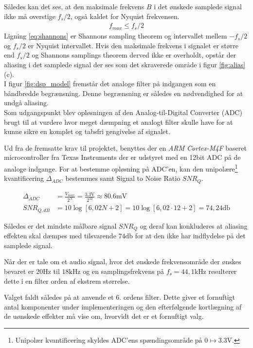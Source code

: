 Således kan det ses, at den maksimale frekvens $B$ i det ønskede samplede signal ikke må overstige $f_s/2$, også kaldet for Nyquist frekvensen.
\begin{align}
	f_{max} \leq f_s/2 \label{eq:shannons}
\end{align}
Ligning \ref{eq:shannons} er Shannons sampling theorem og intervallet mellem $-f_s/2$ og $f_s/2$ er Nyquist intervallet.
Hvis den maksimale frekvens i signalet er større end $f_s/2$ og Shannons samplings theorem derved ikke er overholdt, opstår der aliasing i det samplede signal der ses som det skraverede område i figur \ref{fig:alias}(c).
\\
I figur \ref{fig:dsp_model} fremstår det analoge filter på indgangen som en båndbredde begrænsning.
Denne begrænsning er således en nødvendighed for at undgå aliasing. 
\\
Som udgangspunkt blev opløsningen af den Analog-til-Digital Converter (ADC) brugt til at vurdere hvor meget dæmpning et analogt filter skulle have for at kunne sikre en komplet og tabsfri gengivelse af signalet.

Ud fra de fremsatte krav til projektet, benyttes der en \emph{ARM Cortex-M4F} baseret microcontroller fra Texas Instruments \cite{spmu296} der er udstyret med en 12bit ADC på de analoge indgange.
For at bestemme opløsning på ADC'en, kan den unipolære\footnote{Unipolær kvantificering skyldes ADC'ens spændingsområde på $0 \longmapsto \num{3.3}\si{\volt}$.} kvantificering $\Delta_{ADC}$ bestemmes samt Signal to Noise Ratio $SNR_Q$.
   
\begin{align}
	\Delta_{ADC} &= \frac{V_{max}}{2^N} = \frac{\num{3.3}\si{\volt}}{2^{12}} \approx \num{80.6}\si{\milli\volt}\\
	SNR_{Q,dB} &= 10 \log \left[6,02 N + 2 \right] = 10 \log \left[6,02\cdot 12+2\right] = 74,24 \si{\decibel} 
\end{align}
 
Således er det mindste målbare signal $SNR_Q$ og deraf kan konkluderes at aliasing effekten skal dæmpes med tilsvarende $74\si{\decibel}$ for at den ikke har indflydelse på det samplede signal.

Når der er tale om et audio signal, hvor det ønskede frekvensområde der ønskes bevaret er $20\si{\hertz}$ til $18\si{\kilo\hertz}$ og en samplingsfrekvens på $f_s = 44,1\si{\kilo\hertz}$ resulterer dette i en filter orden af ekstrem størrelse.

Valget faldt således på at anvende et 6. ordens filter. Dette giver et fornuftigt antal komponenter under implementeringen og den efterfølgende kortlægning af de uønskede effekter må vise om, hvorvidt det er et fornuftigt valg.  
 

